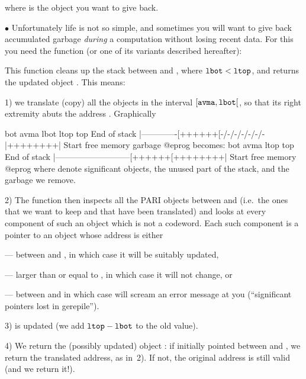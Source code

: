 
\noindent where  is the object you want to give back.

\noindent$\bullet$
Unfortunately life is not so simple, and sometimes you will want
to give back accumulated garbage \emph{during} a computation without losing
recent data. For this you need the  function (or one of its
variants described hereafter):


\noindent
This function cleans up the stack between  and , where
${\tt lbot} < {\tt ltop}$, and returns the updated object . This means:

1) we translate (copy) all the objects in the interval
$[{\tt avma}, {\tt lbot}[$, so that its right extremity abuts the address
. Graphically

\vbox{\bprog
             bot           avma   lbot          ltop     top
End of stack  |-------------[++++++[-/-/-/-/-/-/-|++++++++|  Start
                free memory            garbage
@eprog
\noindent becomes:
\bprog
             bot                         avma   ltop     top
End of stack  |---------------------------[++++++[++++++++|  Start
                       free memory
@eprog
}
\noindent where \kbd{++} denote significant objects, \kbd{--} the unused part
of the stack, and \kbd{-/-} the garbage we remove.

2) The function then inspects all the PARI objects between  and
 (i.e.~the ones that we want to keep and that have been translated)
and looks at every component of such an object which is not a codeword. Each
such component is a pointer to an object whose address is either

--- between  and , in which case it will be suitably
updated,

--- larger than or equal to , in which case it will not change, or

--- between  and  in which case  will
scream an error message at you (``significant pointers lost in gerepile'').

3)  is updated (we add ${\tt ltop} - {\tt lbot}$ to the old value).

4) We return the (possibly updated) object : if  initially
pointed between  and , we return the translated
address, as in~2). If not, the original address is still valid (and we return
it!).

